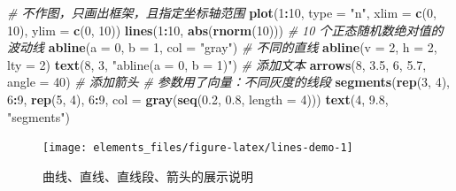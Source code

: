 \documentclass[
  b5paper,
  UTF8,twoside]{book}
\newenvironment{Shaded}{\begin{snugshade}}{\end{snugshade}}
\newcommand{\AttributeTok}[1]{\textcolor[rgb]{0.13,0.29,0.53}{#1}}
\newcommand{\CommentTok}[1]{\textcolor[rgb]{0.56,0.35,0.01}{\textit{#1}}}
\newcommand{\DecValTok}[1]{\textcolor[rgb]{0.00,0.00,0.81}{#1}}
\newcommand{\FloatTok}[1]{\textcolor[rgb]{0.00,0.00,0.81}{#1}}
\newcommand{\FunctionTok}[1]{\textcolor[rgb]{0.13,0.29,0.53}{\textbf{#1}}}
\newcommand{\NormalTok}[1]{#1}
\newcommand{\SpecialCharTok}[1]{\textcolor[rgb]{0.81,0.36,0.00}{\textbf{#1}}}
\newcommand{\StringTok}[1]{\textcolor[rgb]{0.31,0.60,0.02}{#1}}
\begin{document}
\begin{Shaded}
\begin{Highlighting}[]
\CommentTok{\# 不作图，只画出框架，且指定坐标轴范围}
\FunctionTok{plot}\NormalTok{(}\DecValTok{1}\SpecialCharTok{:}\DecValTok{10}\NormalTok{, }\AttributeTok{type =} \StringTok{"n"}\NormalTok{, }\AttributeTok{xlim =} \FunctionTok{c}\NormalTok{(}\DecValTok{0}\NormalTok{, }\DecValTok{10}\NormalTok{), }\AttributeTok{ylim =} \FunctionTok{c}\NormalTok{(}\DecValTok{0}\NormalTok{, }\DecValTok{10}\NormalTok{))}
\FunctionTok{lines}\NormalTok{(}\DecValTok{1}\SpecialCharTok{:}\DecValTok{10}\NormalTok{, }\FunctionTok{abs}\NormalTok{(}\FunctionTok{rnorm}\NormalTok{(}\DecValTok{10}\NormalTok{))) }\CommentTok{\# 10 个正态随机数绝对值的波动线}
\FunctionTok{abline}\NormalTok{(}\AttributeTok{a =} \DecValTok{0}\NormalTok{, }\AttributeTok{b =} \DecValTok{1}\NormalTok{, }\AttributeTok{col =} \StringTok{"gray"}\NormalTok{) }\CommentTok{\# 不同的直线}
\FunctionTok{abline}\NormalTok{(}\AttributeTok{v =} \DecValTok{2}\NormalTok{, }\AttributeTok{h =} \DecValTok{2}\NormalTok{, }\AttributeTok{lty =} \DecValTok{2}\NormalTok{)}
\FunctionTok{text}\NormalTok{(}\DecValTok{8}\NormalTok{, }\DecValTok{3}\NormalTok{, }\StringTok{"abline(a = 0, b = 1)"}\NormalTok{) }\CommentTok{\# 添加文本}
\FunctionTok{arrows}\NormalTok{(}\DecValTok{8}\NormalTok{, }\FloatTok{3.5}\NormalTok{, }\DecValTok{6}\NormalTok{, }\FloatTok{5.7}\NormalTok{, }\AttributeTok{angle =} \DecValTok{40}\NormalTok{) }\CommentTok{\# 添加箭头}
\CommentTok{\# 参数用了向量：不同灰度的线段}
\FunctionTok{segments}\NormalTok{(}\FunctionTok{rep}\NormalTok{(}\DecValTok{3}\NormalTok{, }\DecValTok{4}\NormalTok{), }\DecValTok{6}\SpecialCharTok{:}\DecValTok{9}\NormalTok{, }\FunctionTok{rep}\NormalTok{(}\DecValTok{5}\NormalTok{, }\DecValTok{4}\NormalTok{), }\DecValTok{6}\SpecialCharTok{:}\DecValTok{9}\NormalTok{, }\AttributeTok{col =} \FunctionTok{gray}\NormalTok{(}\FunctionTok{seq}\NormalTok{(}\FloatTok{0.2}\NormalTok{, }\FloatTok{0.8}\NormalTok{, }\AttributeTok{length =} \DecValTok{4}\NormalTok{)))}
\FunctionTok{text}\NormalTok{(}\DecValTok{4}\NormalTok{, }\FloatTok{9.8}\NormalTok{, }\StringTok{"segments"}\NormalTok{)}
\end{Highlighting}
\end{Shaded}

\begin{figure}

{\centering \texttt{[image: elements\_files/figure-latex/lines-demo-1]} 

}

\caption{ 曲线、直线、直线段、箭头的展示说明 }\label{fig:lines-demo}
\end{figure}
\end{document}
